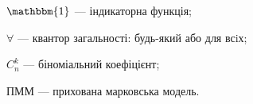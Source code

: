 $\mathbbm{1}$ --- індикаторна функція;

$\forall$ --- квантор загальності: будь-який або для всiх;

$C^k_n$ --- біноміальний коефіцієнт;

ПММ --- прихована марковська модель.
